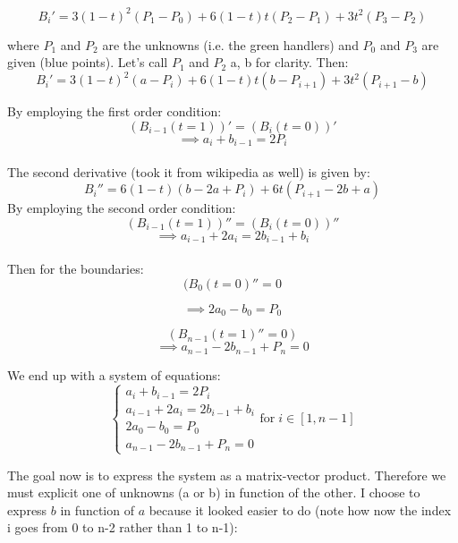 \documentclass[12pt]{article}
\begin{document}
$$B_i' = 3(1-t)^{2} (P_1 - P_0) +6(1-t)t( P_{2}- P_{1})+3t^{2}(P_{3}- P_{2})$$  

where $P_1$ and $P_2$ are the unknowns (i.e. the green handlers) and $P_0$ and $P_3$ are given (blue points). Let's call $P_1$ and $P_2$ a, b for clarity. Then: \\

$$B_i' = 3(1-t)^{2} (a - P_i) +6(1-t)t(b - P_{i+1})+3t^{2}(P_{i+1} - b)$$  

By employing the first order condition: \\
\begin{equation}
	(B_{i-1}(t=1))' = (B_i(t=0))'
	\label{eq:first_condition}
\end{equation}
$$\implies a_i + b_{i-1} = 2 P_i$$
\\
The second derivative (took it from wikipedia as well) is given by: \\
$$B_i'' = 6(1-t) (b - 2 a + P_i) + 6t (P_{i+1} -2 b + a) $$
By employing the second order condition: \\

\begin{equation}
	(B_{i-1}(t=1))'' = (B_i(t=0))''
	\label{eq:eq:second_condition}
\end{equation}
$$ \implies  a_{i-1} + 2 a_i = 2 b_{i-1} + b_i $$
\\
Then for the boundaries: \\
$$(B_0 (t=0)'' = 0$$

$$\implies 2 a_0 -b_0 = P_0 $$

$$(B_{n-1} (t=1)'' = 0)$$
$$ \implies  a_{n-1} -2 b_{n-1} + P_{n} = 0 $$

We end up with a system of equations: \\
\begin{equation}
\begin{cases}
a_i + b_{i-1} = 2 P_i \\
a_{i-1} + 2 a_i = 2 b_{i-1} + b_i  \\
2 a_0 -b_0 = P_0  \\
a_{n-1} -2 b_{n-1} + P_{n} = 0
\end{cases}
\textrm{for} \; i \in [1, n-1]

\label{eq:system}	
\end{equation}

The goal now is to express the system as a matrix-vector product. Therefore we must explicit one of unknowns (a or b) in function of the other. I choose to express $b$ in function of $a$ because it looked easier to do (note how now the index i goes from 0 to n-2 rather than 1 to n-1):
\end{document}
